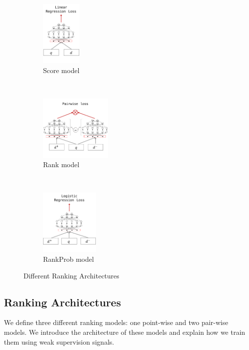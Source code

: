 \documentclass[sigconf]{acmart}
\newcommand{\mone}{Score\xspace}
\newcommand{\mtwo}{Rank\xspace}
\newcommand{\mthree}{RankProb\xspace}
\newcommand{\sshrink}{\vspace{-.80ex}}
\begin{document}
\label{sec:models}
\begin{figure}[t]
    \centering
    \begin{subfigure}[t]{0.23\columnwidth}
        \centering
        \includegraphics[height=3.2cm]{Images/m1_n}\vspace*{-3ex}%
        \caption{\label{fig:m1}\mone model}
    \end{subfigure}%
    ~
    \begin{subfigure}[t]{0.40\columnwidth}
        \centering
        \includegraphics[height=3.2cm]{Images/m2_n}\vspace*{-3ex}%
        \caption{\label{fig:m2}\mtwo model}
    \end{subfigure}%
    ~
    \begin{subfigure}[t]{0.37\columnwidth}
        \centering
        \includegraphics[height=3.2cm]{Images/m3_n}\vspace*{-3ex}%
        \caption{\label{fig:m3}\mthree model}
    \end{subfigure}%
    \vspace*{-2ex}%
    \caption{\label{fig:ranking-arch} Different Ranking Architectures}
    \vspace{-20pt}
\end{figure}
%
\sshrink
\subsection{Ranking Architectures}
We define three different ranking models: 
one point-wise and two pair-wise models. 
We introduce the architecture of these models and explain how we train them using weak supervision signals.
\end{document}
